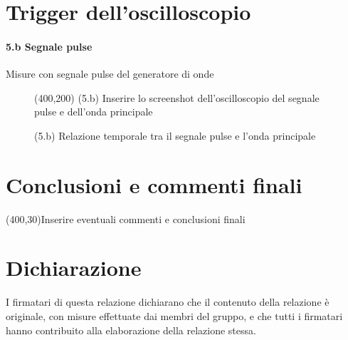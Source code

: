 \documentclass[10pt,a4paper]{article}
\begin{document}
\section{Trigger dell'oscilloscopio}
\paragraph{5.b Segnale pulse}
Misure con segnale pulse del generatore di onde
\begin{figure}[h]
\centering
\framebox(400,200){ (5.b) Inserire lo screenshot dell'oscilloscopio del segnale pulse e dell'onda principale  }
\caption{(5.b) Relazione temporale tra il segnale pulse e l'onda principale}
\end{figure}


\section{Conclusioni e commenti finali}
\framebox(400,30){Inserire eventuali commenti e conclusioni finali}

\section*{Dichiarazione}
I firmatari di questa relazione dichiarano che il contenuto della relazione \`e originale, con misure effettuate dai membri del gruppo, e che tutti i firmatari hanno contribuito alla elaborazione della relazione stessa.
\end{document}
